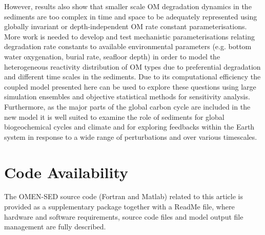 \documentclass[gmd, manuscript]{copernicus}
\begin{document}
However, results also show that smaller scale OM degradation dynamics in the sediments are too complex in time and space to be adequately represented using globally invariant or depth-independent OM rate constant parameterisations. 
More work is needed to develop and test mechanistic parameterisations relating degradation rate constants to available environmental parameters (e.g. bottom water oxygenation, burial rate, seafloor depth) in order to model the heterogeneous 
reactivity distribution of OM types due to preferential degradation and different time scales in the sediments. 
Due to its computational efficiency the coupled model presented here can be used to explore these questions using large simulation ensembles and objective statistical methods for sensitivity analysis. 
Furthermore, as the major parts of the global carbon cycle are included in the new model it is well suited to examine the role of sediments for global biogeochemical cycles and climate and for 
exploring feedbacks within the Earth system in response to a wide range of perturbations and over various timescales. 


\section {Code Availability}
The OMEN-SED source code (Fortran and Matlab) related to this article is provided
as a supplementary package together with a ReadMe file,
where hardware and software requirements, source code files
and model output file management are fully described.

\appendix
\end{document}
